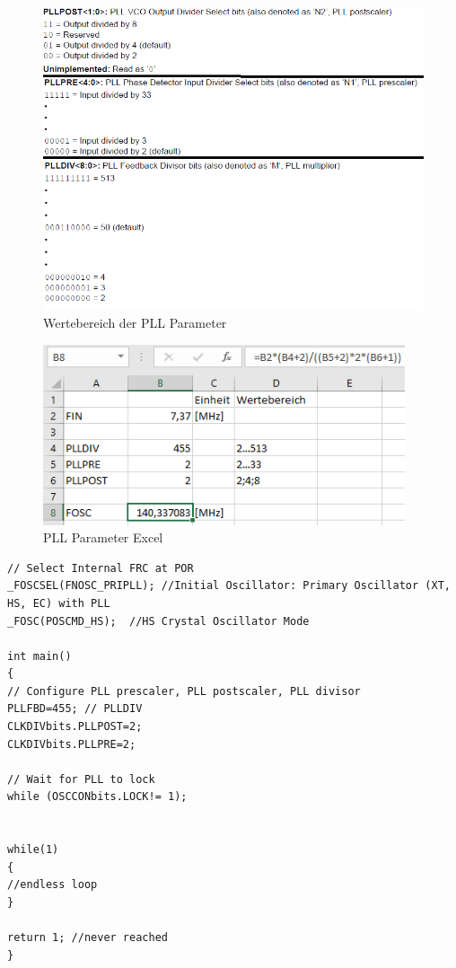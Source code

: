\begin{figure}
	\centering
	\includegraphics[width=\textwidth]{Images/PLLParameter}
	\caption[Wertebereich der PLL Parameter]{Wertebereich der PLL Parameter}
	\label{image:PLLParameter}
\end{figure}

\begin{figure}
	\centering
	\includegraphics[width=0.95\textwidth]{Images/PLLParameterExcel}
	\caption[Berechnung der PLL Parameter in Excel]{PLL Parameter Excel}
	\label{image:PLLParameterExcel}
\end{figure}

\newpage
\begin{lstlisting}[frame=htrbl, caption={Code Example for Using PLL with 7.37 MHz Internal FRC}, label={lst:OscillatorSetup}]
// Select Internal FRC at POR
_FOSCSEL(FNOSC_PRIPLL); //Initial Oscillator: Primary Oscillator (XT, HS, EC) with PLL
_FOSC(POSCMD_HS);  //HS Crystal Oscillator Mode

int main()
{
// Configure PLL prescaler, PLL postscaler, PLL divisor
PLLFBD=455; // PLLDIV
CLKDIVbits.PLLPOST=2;
CLKDIVbits.PLLPRE=2;

// Wait for PLL to lock
while (OSCCONbits.LOCK!= 1);


while(1)
{
//endless loop
}

return 1; //never reached
}
\end{lstlisting}
